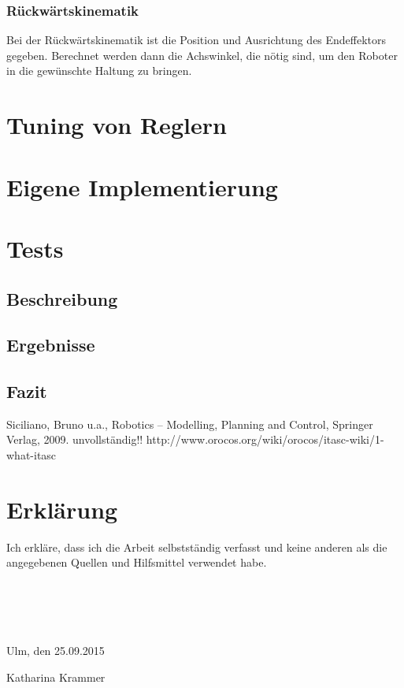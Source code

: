 \documentclass[a4paper,12pt,twoside,openright,DIV=9
]{scrbook}
\begin{document}
\subsection{Rückwärtskinematik}
Bei der Rückwärtskinematik ist die Position und Ausrichtung des Endeffektors gegeben. Berechnet werden dann die Achswinkel, die nötig sind, um den Roboter in die gewünschte Haltung zu bringen.

\chapter{Tuning von Reglern}
\chapter{Eigene Implementierung}
\section{}
\chapter{Tests}
\section{Beschreibung}
\section{Ergebnisse}
\section{Fazit}



\begin{thebibliography}{5}
Siciliano, Bruno u.a., Robotics -- Modelling, Planning and Control, Springer Verlag, 2009.
 unvollständig!! http://www.orocos.org/wiki/orocos/itasc-wiki/1-what-itasc %
\end{thebibliography}


\chapter*{Erklärung}
Ich erkläre, dass ich die Arbeit selbstständig verfasst und keine anderen als die angegebenen Quellen und Hilfsmittel verwendet habe. \\ \\ \\ \\ \\
\begin{minipage}{0.4\textwidth}
Ulm, den 25.09.2015
\end{minipage}
\begin{minipage}{0.6\textwidth}
\begin{flushright}
Katharina Krammer
\end{flushright}
\end{minipage}
\end{document}
